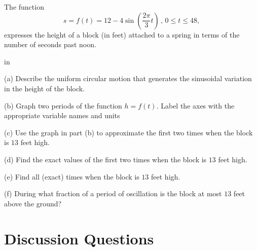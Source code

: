 \documentclass{ximera}
\newcommand{\pskip}{\vskip 0.1 in}
\begin{document}
\begin{question}  \label{Qert7u8gg}
The function
\[
    s  = f(t) = 12 - 4 \sin \left( \frac{2\pi}{3}t  \right) \, , \, 0\leq t \leq 48 ,
\]
expresses the height of a block (in feet) attached to a spring in terms of the number of seconds past noon.

\pskip

(a) Describe the uniform circular motion that generates the sinusoidal variation in the height of the block.

(b) Graph two periods of the function $h=f(t)$. Label the axes with the appropriate variable names and units

(c) Use the graph in part (b) to approximate the first two times when the block is $13$ feet high. 

(d) Find the exact values of the first two times when the block is $13$ feet high. 

(e) Find all (exact) times when the block is $13$ feet high. 

(f) During what fraction of a period of oscillation is the block at most $13$ feet above the ground?

\end{question}



\section{Discussion Questions}
\end{document}
